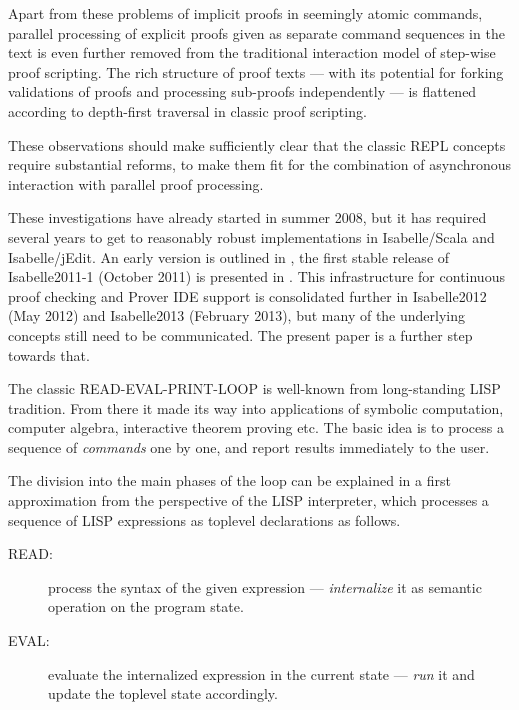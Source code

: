 \begin{isabellebody}
\begin{isamarkuptext}
  Apart from these problems of implicit proofs in seemingly atomic
  commands, parallel processing of explicit proofs given as separate
  command sequences in the text is even further removed from the
  traditional interaction model of step-wise proof scripting.  The
  rich structure of proof texts --- with its potential for forking
  validations of proofs and processing sub-proofs independently --- is
  flattened according to depth-first traversal in classic proof
  scripting.

  \medskip These observations should make sufficiently clear that the
  classic REPL concepts require substantial reforms, to make them fit
  for the combination of asynchronous interaction with parallel proof
  processing.

  These investigations have already started in summer 2008, but it has
  required several years to get to reasonably robust implementations
  in Isabelle/Scala and Isabelle/jEdit.  An early version is outlined
  in \cite{Wenzel:2010}, the first stable release of Isabelle2011-1
  (October 2011) is presented in \cite{Wenzel:2012:CICM}.  This
  infrastructure for continuous proof checking and Prover IDE support
  is consolidated further in Isabelle2012 (May 2012) and Isabelle2013
  (February 2013), but many of the underlying concepts still need to
  be communicated. The present paper is a further step towards that.%
\end{isamarkuptext}%
\isamarkuptrue%
%
\isamarkuptrue%
%
\begin{isamarkuptext}%
The classic READ-EVAL-PRINT-LOOP is well-known from
  long-standing LISP tradition.  From there it made its way into
  applications of symbolic computation, computer algebra, interactive
  theorem proving etc.  The basic idea is to process a sequence of
  \emph{commands} one by one, and report results immediately to the
  user.

  The division into the main phases of the loop can be explained in a
  first approximation from the perspective of the LISP interpreter,
  which processes a sequence of LISP expressions as toplevel
  declarations as follows.

  \begin{description}

  \item[READ:] process the syntax of the given expression ---
  \emph{internalize} it as semantic operation on the program state.

  \item[EVAL:] evaluate the internalized expression in the current
  state --- \emph{run} it and update the toplevel state accordingly.


\end{description}
\end{isamarkuptext}
\end{isabellebody}
